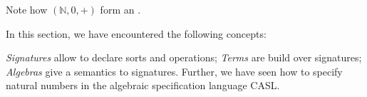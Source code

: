 \documentclass[landscape, slides, light]{mmiss2}
\newcommand{\Nat}{\mbox{$\mathbb N$}} %
\begin{document}
\begin{Package}
\begin{Section}[Label=IntroAlgSpec, Title={Signatures, Terms and Algebras}]
\begin{Paragraph}[Label=Example, Title=A Simple Example]
Note how $(\Nat, 0, +)$ form an .
\end{Paragraph}

\begin{Summary}[Label=Summary, Title=Summing Up]
In this section, we have encountered the following concepts:
\begin{List}[Label=Concepts, ListType=itemize]
\ListItem
\emph{Signatures} allow to declare sorts and operations;
\ListItem
\emph{Terms} are build over signatures;
\ListItem
\emph{Algebras} give a semantics to signatures.
\ListItem
Further, we have seen how to specify natural numbers in the algebraic
specification language CASL.
\end{List}
\end{Summary}
\end{Section}
\end{Package}
\end{document}
